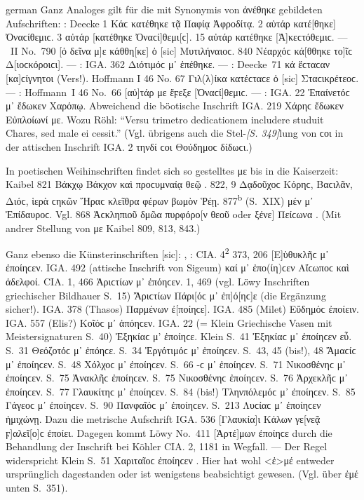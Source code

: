 \begin{otherlanguage*}{german}
Ganz Analoges gilt für die mit Synonymis von ἀνέθηκε gebildeten Aufschriften:  : Deecke 1 Κάϲ  κατέθηκε τᾷ Παφίᾳ Ἀφροδίτᾳ. 2 αὐτάρ  κατέ[θηκε] Ὀναϲίθεμιϲ. 3 αὐτάρ  [κατέθηκε Ὀναϲί]θεμι[ϲ]. 15 αὐτάρ  κατέθηκε [Ἀ]κεϲτόθεμιϲ. — ~II No.~790 [ὁ δεῖνα μ]ε κάθθη[κε] ὀ [sic] Μυτιλήναιοϲ. 840 Νέαρχόϲ  κά[θθηκε το]ῖϲ Δ[ιοϲκόροιϲι]. —  : IGA. 362 Διότιμόϲ μ᾽ ἐπέθηκε. —  : \mbox{Deecke}~71 κά  ἔϲταϲαν [κα]ϲίγνη\-τοι (Vers!). Hoffmann I 46 No. 67 Γιλ(λ)ίκα  κατέϲταϲε ὀ [sic] Σταϲικρέτεοϲ. —  : Hoffmann~I 46 No.~66 [αὐ]τάρ με ἔϝεξε [Ὀναϲί]θεμιϲ. —  : IGA. 22 Ἐπαίνετόϲ μ᾽ ἔδωκεν Χαρόπῳ. Abweichend die böotische Inschrift IGA. 219 Χάρηϲ ἔδωκεν Εὐπλοίωνί με. Wozu Röhl: “Versu trimetro dedicationem includere studuit Chares, sed male ei cessit.” (Vgl. übrigens auch die Stel-\hypertarget{p349}{\emph{[S. 349]}}\label{p349}lung von ϲοι in der attischen Inschrift IGA. 2 τηνδί ϲοι Θούδημοϲ δίδωϲι.)

In poetischen Weihinschriften findet sich so gestelltes με bis in die Kaiserzeit: Kaibel 821 Βάκχῳ  Βάκχον καὶ προϲυμναίᾳ θεῷ . 822, 9 Δᾳδοῦχοϲ  Κόρηϲ, Βαϲιλᾶν, Διόϲ, ἱερὰ ϲηκῶν Ἥραϲ κλεῖθρα φέρων βωμὸν  Ῥέῃ. 877\textsuperscript{b} (S.~XIX)  μέν μ᾽ Ἐπίδαυροϲ. Vgl. 868 Ἀϲκληπιοῦ  δμῶα πυρφόρο[ν θεοῦ oder ξένε] Πείϲωνα . (Mit andrer Stellung von με Kaibel 809, 813, 843.)

Ganz ebenso die Künsterinschriften [sic]: , : CIA. 4\textsuperscript{2} 373, 206 [Ε]ὐθυκλῆϲ μ᾽ ἐποίηϲεν. IGA. 492 (attische Inschrift von Sigeum) καί μ᾽ ἐπο(ίη)\-ϲεν Αἵϲωποϲ καὶ ἁδελφοί. CIA. 1, 466 Ἀριϲτίων μ᾽ ἐπόηϲεν. 1, 469 (vgl. Löwy Inschriften griechischer Bildhauer S.~15) Ἄριϲτίων Πάρι[όϲ μ᾽ ἐπ]ό[ηϲ]ε (die Ergänzung sicher!). IGA. 378 (Thasos) Παρμένων  ἐ[ποίηϲε]. IGA. 485 (Milet) Εὔδημόϲ  ἐποίειν. IGA. 557 (Elis?) Κοῖόϲ μ᾽ ἀπόηϲεν. IGA. 22 (= Klein Griechische Vasen mit Meistersignaturen S.~40) Ἐξηκίαϲ μ’ ἐποίηϲε. Klein S.~41 Ἐξηκίαϲ μ᾽ ἐποίηϲεν εὖ. S.~31 Θεόζοτόϲ μ᾽ ἐπόηϲε. S.~34 Ἐργότιμόϲ μ’ ἐποίηϲεν. S.~43, 45 (bis!), 48 Ἄμαϲίϲ μ᾽ ἐποίηϲεν. S.~48 Χόλχοϲ μ᾽ ἐποίηϲεν. S.~66 -ϲ μ᾽ ἐποίηϲεν. S.~71 Νικοσθένηϲ μ᾽ ἐποίηϲεν. S.~75 Ἀνακλῆϲ  ἐποίηϲεν. S.~75 Νικοσθένηϲ  ἐποίηϲεν. S.~76 Ἀρχεκλῆϲ μ᾽ ἐποίηϲεν. S.~77 Γλαυκίτηϲ μ᾽ ἐποίηϲεν. S.~84 (bis!) Τληνπόλεμόϲ μ᾽ ἐποίηϲεν. S.~85 Γάγεοϲ μ᾽ ἐποίηϲεν. S.~90 Πανφαῖόϲ μ᾽ ἐποίηϲεν. S.~213 Λυϲίαϲ μ᾽ ἐποίηϲεν ἡμιχώνῃ. Dazu die metrische Aufschrift IGA. 536 [Γλαυ\-κία]ι  Κάλων γε[νεᾷ ϝ]αλεῖ[ο]ϲ ἐποίει. Dagegen kommt Löwy No.~411 [Ἀρτέ]\-μων  ἐποίηϲε durch die Behandlung der Inschrift bei Köhler CIA. 2, 1181 in Wegfall. — Der Regel widerspricht Klein S.~51 Χαριταῖοϲ ἐποίηϲεν . Hier hat wohl <ἐ>μέ entweder ursprünglich dagestanden oder ist wenigstens beabsichtigt gewesen. (Vgl. über ἐμέ unten S.~351).


\end{otherlanguage*}
